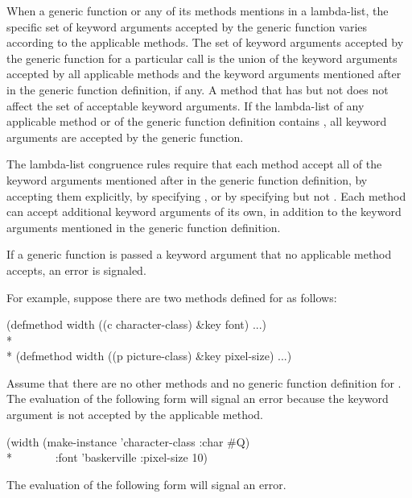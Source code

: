 When a generic function or any of its methods mentions  in
a lambda-list, the specific set of keyword arguments accepted by the
generic function varies according to the applicable methods.  The set
of keyword arguments accepted by the generic function for a particular
call is the union of the keyword arguments accepted by all applicable
methods and the keyword arguments mentioned after  in the
generic function definition, if any.  A method that has 
but not  does not affect the set of acceptable keyword
arguments.  If the lambda-list of any applicable method or of the
generic function definition contains , all
keyword arguments are accepted by the generic function.

The lambda-list congruence rules require that each method
accept all of the keyword arguments mentioned after  in the
generic function definition, by accepting them explicitly, by
specifying , or by specifying  but
not .  Each method can accept additional keyword arguments
of its own, in addition to the keyword arguments mentioned in the
generic function definition.


If a generic function is passed a keyword argument that no applicable
method accepts, an error is signaled.

For example, suppose there are two methods defined for 
as follows:

\begin{lisp}
(defmethod width ((c character-class) \&key font) ...)\\*
\\*
(defmethod width ((p picture-class) \&key pixel-size) ...)
\end{lisp}

\noindent Assume that there are no other methods and no generic
function definition for . The evaluation of the
following form will signal an error because the keyword argument
 is not accepted by the applicable method.

\begin{lisp}
(width (make-instance 'character-class :char \#{\Xbackslash}Q) \\*
~~~~~~~:font 'baskerville :pixel-size 10)
\end{lisp}

The evaluation of the following form will signal an error.

